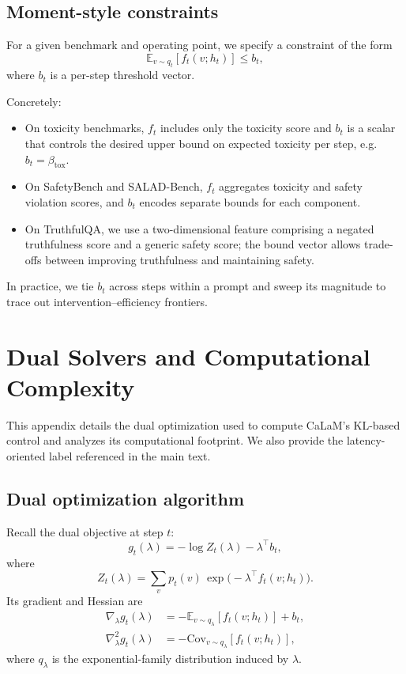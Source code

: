 \documentclass{article}
\theoremstyle{plain}
\theoremstyle{definition}
\theoremstyle{remark}
\begin{document}
\subsection{Moment-style constraints}

For a given benchmark and operating point, we specify a constraint of the form
\begin{equation}
  \mathbb{E}_{v \sim q_t}[f_t(v;h_t)] \le b_t,
\end{equation}
where $b_t$ is a per-step threshold vector.

Concretely:

\begin{itemize}[leftmargin=1.5em]
  \item On toxicity benchmarks, $f_t$ includes only the toxicity score and $b_t$ is a scalar that controls the desired upper bound on expected toxicity per step, e.g.\ $b_t = \beta_{\mathrm{tox}}$.
  \item On SafetyBench and SALAD-Bench, $f_t$ aggregates toxicity and safety violation scores, and $b_t$ encodes separate bounds for each component.
  \item On TruthfulQA, we use a two-dimensional feature comprising a negated truthfulness score and a generic safety score; the bound vector allows trade-offs between improving truthfulness and maintaining safety.
\end{itemize}

In practice, we tie $b_t$ across steps within a prompt and sweep its magnitude to trace out intervention--efficiency frontiers.

\section{Dual Solvers and Computational Complexity}
\label{app:kl-efficient}

This appendix details the dual optimization used to compute CaLaM's KL-based control and analyzes its computational footprint.
We also provide the latency-oriented label referenced in the main text.

\subsection{Dual optimization algorithm}

Recall the dual objective at step $t$:
\begin{equation}
  g_t(\lambda)
  =
  -\log Z_t(\lambda) - \lambda^\top b_t,
\end{equation}
where
\begin{equation}
  Z_t(\lambda)
  =
  \sum_v p_t(v)\,\exp\big(-\lambda^\top f_t(v;h_t)\big).
\end{equation}
Its gradient and Hessian are
\begin{align}
  \nabla_\lambda g_t(\lambda)
  &=
  -\mathbb{E}_{v \sim q_\lambda}[f_t(v;h_t)] + b_t,
  \\
  \nabla^2_\lambda g_t(\lambda)
  &=
  -\mathrm{Cov}_{v \sim q_\lambda}[f_t(v;h_t)],
\end{align}
where $q_\lambda$ is the exponential-family distribution induced by $\lambda$.
\end{document}
